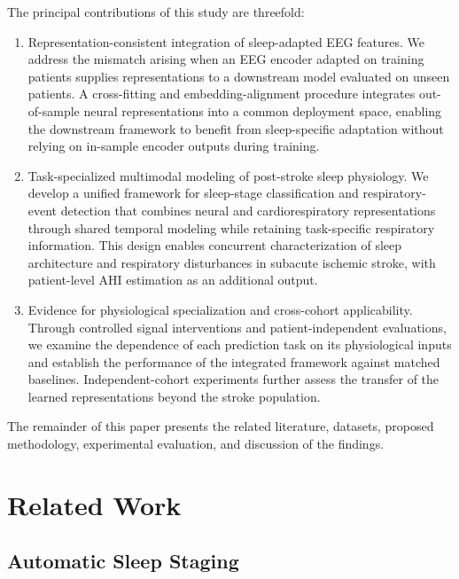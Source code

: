 \documentclass[a4paper,fleqn]{cas-sc}
\begin{document}
The principal contributions of this study are threefold:

\begin{enumerate}

\item Representation-consistent integration of sleep-adapted EEG features. We address the mismatch arising when an EEG encoder adapted on training patients supplies representations to a downstream model evaluated on unseen patients. A cross-fitting and embedding-alignment procedure integrates out-of-sample neural representations into a common deployment space, enabling the downstream framework to benefit from sleep-specific adaptation without relying on in-sample encoder outputs during training.

\item Task-specialized multimodal modeling of post-stroke sleep physiology. We develop a unified framework for sleep-stage classification and respiratory-event detection that combines neural and cardiorespiratory representations through shared temporal modeling while retaining task-specific respiratory information. This design enables concurrent characterization of sleep architecture and respiratory disturbances in subacute ischemic stroke, with patient-level AHI estimation as an additional output.

\item Evidence for physiological specialization and cross-cohort applicability. Through controlled signal interventions and patient-independent evaluations, we examine the dependence of each prediction task on its physiological inputs and establish the performance of the integrated framework against matched baselines. Independent-cohort experiments further assess the transfer of the learned representations beyond the stroke population.

\end{enumerate}

The remainder of this paper presents the related literature, datasets, proposed methodology, experimental evaluation, and discussion of the findings.

\section{Related Work}
\label{sec:related}

\subsection{Automatic Sleep Staging}
\end{document}
